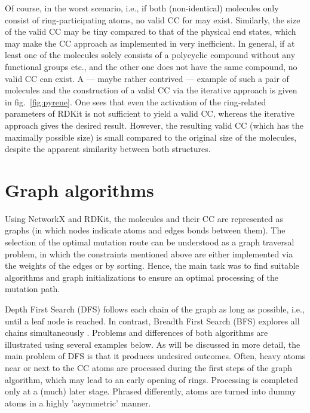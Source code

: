 Of course, in the worst scenario, i.e., if both (non-identical) molecules only consist of ring-participating atoms, no valid CC for \trafo may exist. Similarly, the size of the valid CC may be tiny compared to that of the physical end states, which may make the CC approach as implemented in \trafo very inefficient.  In general, if at least one of the molecules solely consists of a polycyclic compound without any functional groups etc., and the other one does not have the same compound, no valid CC can exist. 
A --- maybe rather contrived --- example of such a pair of molecules and the construction of a valid CC via the iterative approach is given in fig.~\ref{fig:pyrene}. One sees that even the activation of the ring-related parameters of RDKit is not sufficient to yield a valid CC, whereas the iterative approach gives the desired result. However, the resulting valid CC (which has the maximally possible size) is small compared to the original size of the molecules, despite the apparent similarity between both structures.



\section{Graph algorithms}

Using NetworkX and RDKit, the molecules and their CC are
represented as graphs (in which nodes indicate atoms and edges bonds
between them). The selection of the optimal mutation route can be
understood as a graph traversal problem, in which the constraints mentioned
above are either implemented via the weights of the edges or by sorting.
Hence, the main task was to find suitable algorithms and graph initializations
to ensure an optimal processing of the mutation path.

Depth First Search (DFS) follows each chain of the graph as long as
possible, i.e., until a leaf node is reached. In contrast, Breadth
First Search (BFS) explores all chains simultaneously \cite{Even.2012}.
Problems and differences of both algorithms are illustrated using
several examples below. As will be discussed in more detail, the main problem of DFS is that it produces undesired outcomes. Often, heavy atoms near or next to the CC atoms are processed during the first steps of the graph algorithm, which may lead to an early opening of rings. Processing is completed only at a (much) later stage. Phrased differently, atoms are turned into dummy atoms in a highly 'asymmetric' manner.   

